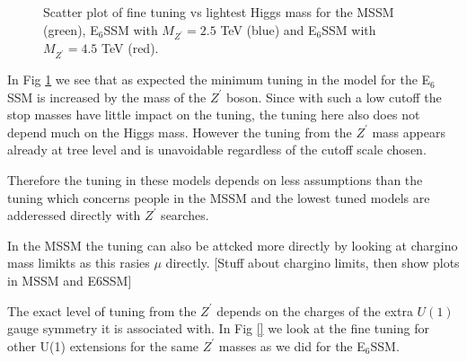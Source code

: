 \documentclass[preprint,amsmath,amssymb,aps,superscriptaddress,prd,showpacs,floatfix]{revtex4-1}
\begin{document}
\begin{figure}[h]
\begin{center}
\caption{Scatter plot of fine tuning vs lightest Higgs mass for the
  MSSM (green), E$_6$SSM with $M_{Z^\prime} = 2.5$ TeV (blue) and
  E$_6$SSM with $M_{Z^\prime} = 4.5$ TeV (red).}
\label{Fig:e6ssmvsmssm}
\end{center}
\end{figure}
In Fig \ref{Fig:e6ssmvsmssm} we see that as expected the minimum
tuning in the model for the E$_6$SSM is increased by the mass of the
$Z^\prime$ boson.  Since with such a low cutoff the stop masses have
little impact on the tuning, the tuning here also does not depend much
on the Higgs mass.  However the tuning from the $Z^\prime$ mass
appears already at tree level and is unavoidable regardless of the
cutoff scale chosen.  

Therefore the tuning in these models depends on less assumptions than
the tuning which concerns people in the MSSM and the lowest tuned
models are adderessed directly with $Z^\prime$ searches.

In the MSSM the tuning can also be attcked more directly by looking at
chargino mass limikts as this rasies $\mu$ directly.  [Stuff about
  chargino limits, then show plots in MSSM and E6SSM]


The exact level of tuning from the $Z^\prime$ depends on the charges of
the extra $U(1)$ gauge symmetry it is associated with.  In Fig \ref{}
we look at the fine tuning for other U(1) extensions for the same
$Z^\prime$ masses as we did for the E$_6$SSM.
\end{document}
